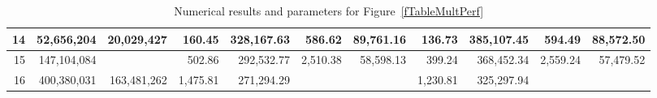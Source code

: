 \documentclass[conference]{IEEEtran}
\begin{document}
\begin{table*}[htb]
\begin{tabular}{|r|r|r|r|r|r|r|r|r|r|r|}
\hline                                                                                                               
14 & 52,656,204 & 20,029,427 & 160.45 & 328,167.63 & 586.62 & 89,761.16 & 136.73 & 385,107.45 & 594.49 & 88,572.50 \\
\hline                                                                                                               
15 & 147,104,084 &  & 502.86 & 292,532.77 & 2,510.38 & 58,598.13 & 399.24 & 368,452.34 & 2,559.24 & 57,479.52 \\     
\hline                                                                                                               
16 & 400,380,031 & 163,481,262 & 1,475.81 & 271,294.29 &  &  & 1,230.81 & 325,297.94 &  &  \\                        
\hline                                                                                                               
\end{tabular}
\caption{Numerical results and parameters for Figure~\ref{fTableMultPerf}}
\label{ltable}
\end{table*}
\end{document}
